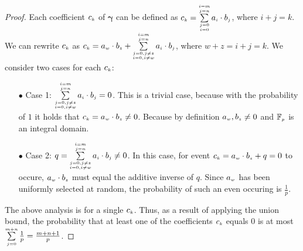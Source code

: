 \begin{proof}
Each coefficient $c_{\scriptscriptstyle  k}$ of $\bm\gamma$ can be defined as $c_{\scriptscriptstyle  k}=\sum\limits_{\substack{\scriptscriptstyle j=0\\ \scriptscriptstyle i=0}}^{\substack{\scriptscriptstyle i=m\\ \scriptscriptstyle j=n}}a_{\scriptscriptstyle i}\cdot b_{\scriptscriptstyle j}$, where $i+j=k$. We can rewrite $c_{\scriptscriptstyle  k}$ as  $c_{\scriptscriptstyle  k}=a_{\scriptscriptstyle w}\cdot b_{\scriptscriptstyle z}+ \sum\limits_{\substack{\scriptscriptstyle j=0, j\neq z\\ \scriptscriptstyle i=0, i\neq w}}^{\substack{\scriptscriptstyle i=m\\ \scriptscriptstyle j=n}}a_{\scriptscriptstyle i}\cdot b_{\scriptscriptstyle j}$, where $w+z=i+j=k$. 
%
We consider two cases for each $c_{\scriptscriptstyle  k}$:

\begin{itemize}

\item[$\bullet$]  {Case 1}: $\sum\limits_{\substack{\scriptscriptstyle j=0, j\neq z\\ \scriptscriptstyle i=0, i\neq w}}^{\substack{\scriptscriptstyle i=m\\ \scriptscriptstyle j=n}}a_{\scriptscriptstyle i}\cdot b_{\scriptscriptstyle j}=0$.  This is a trivial case, because with the  probability of $1$ it holds that $c_{\scriptscriptstyle  k}=a_{\scriptscriptstyle w}\cdot b_{\scriptscriptstyle z}\neq 0$. Because by  definition $a_{\scriptscriptstyle w}, b_{\scriptscriptstyle z}\neq0$ and $\mathbb{F}_{\scriptscriptstyle p}$ is an integral domain. 


%




\item[$\bullet$]  {Case 2}: $q=\sum\limits_{\substack{\scriptscriptstyle j=0, j\neq z\\ \scriptscriptstyle i=0, i\neq w}}^{\substack{\scriptscriptstyle i=m\\ \scriptscriptstyle j=n}}a_{\scriptscriptstyle i}\cdot b_{\scriptscriptstyle j}\neq 0$. In this case, for  event $c_{\scriptscriptstyle  k}=a_{\scriptscriptstyle w}\cdot b_{\scriptscriptstyle z}+q=0$ to occure, $a_{\scriptscriptstyle w}\cdot b_{\scriptscriptstyle z}$ must equal the additive inverse of $q$. Since $a_{\scriptscriptstyle w}$ has been uniformly selected at random, the probability of such an even occuring is $\frac{1}{p}$.
\end{itemize}

The above analysis is for a single $c_{\scriptscriptstyle  k}$. Thus, as a result of applying the union bound, the probability that at least one of the coefficients $c_{\scriptscriptstyle  k}$ equals $0$ is at most $\sum\limits^{\scriptscriptstyle m+n}_{\scriptscriptstyle j=0}\frac{1}{p}= \frac{m+n+1}{p}$.
%
 \end{proof}




